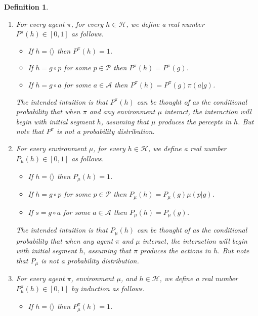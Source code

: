 \documentclass[twoside]{article}
\newtheorem{definition}[theorem]{Definition}
\begin{document}
\begin{definition}
\label{pullbackdef}
    \begin{enumerate}
        \item
        For every agent $\pi$, for every $h\in\mathcal H$, we define a real number
        $P^\pi(h)\in[0,1]$ as follows.
        \begin{itemize}
            \item
            If $h=\langle\rangle$ then $P^\pi(h)=1$.
            \item
            If $h=g\circ p$ for some $p\in\mathcal P$ then $P^\pi(h)=P^\pi(g)$.
            \item
            If $h=g\circ a$ for some $a\in\mathcal A$ then $P^\pi(h)=P^\pi(g)\pi(a|g)$.
        \end{itemize}
        The intended intuition is that $P^\pi(h)$ can be thought of as the
        conditional probability that when $\pi$
        and any environment
        $\mu$ interact, the interaction will begin with initial segment
        $h$, \emph{assuming}
        that $\mu$ produces the percepts in $h$.
        But note that $P^\pi$ is \emph{not} a probability distribution.
        \item
        For every environment $\mu$, for every $h\in\mathcal H$, we define a real number
        $P_\mu(h)\in[0,1]$ as follows.
        \begin{itemize}
            \item
            If $h=\langle\rangle$ then $P_\mu(h)=1$.
            \item
            If $h=g\circ p$ for some $p\in\mathcal P$ then $P_\mu(h)=P_\mu(g)\mu(p|g)$.
            \item
            If $s=g\circ a$ for some $a\in\mathcal A$ then $P_\mu(h)=P_\mu(g)$.
        \end{itemize}
        The intended intuition is that $P_\mu(h)$ can be thought of as the
        conditional probability that when any agent $\pi$ and $\mu$ interact,
        the interaction will begin with initial segment $h$, \emph{assuming} that
        $\pi$ produces the actions in $h$.
        But note that $P_\mu$ is \emph{not} a probability distribution.
        \item
        For every agent $\pi$, environment $\mu$, and $h\in\mathcal H$, we define a
        real number $P^\pi_\mu(h)\in[0,1]$ by induction as follows.
        \begin{itemize}
            \item
            If $h=\langle\rangle$ then $P^\pi_\mu(h)=1$.

\end{itemize}
\end{enumerate}
\end{definition}
\end{document}
